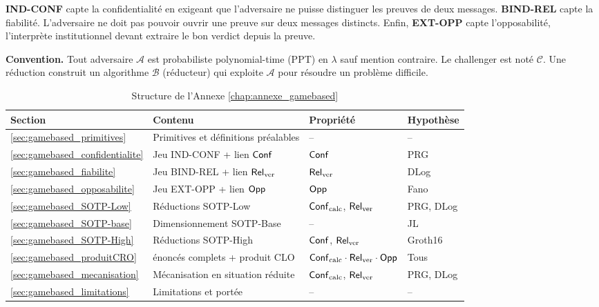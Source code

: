 \begin{sloppypar}
\textbf{IND-CONF} capte la confidentialit\'e en exigeant que l'adversaire ne puisse
distinguer les preuves de deux messages. \textbf{BIND-REL} capte la
fiabilit\'e. L'adversaire ne doit pas pouvoir ouvrir une preuve sur
deux messages distincts. Enfin, \textbf{EXT-OPP} capte l'opposabilit\'e,
l'interpr\`ete institutionnel devant extraire le bon verdict depuis la
preuve.

\noindent\textbf{Convention.} Tout adversaire $\mathcal{A}$ est
probabiliste polynomial-time (PPT) en $\lambda$ sauf mention contraire.
Le challenger est not\'e $\mathcal{C}$. Une r\'eduction construit un
algorithme $\mathcal{B}$ (r\'educteur) qui exploite $\mathcal{A}$ pour
r\'esoudre un probl\`eme difficile.

\begin{table}[htbp]
\centering
\caption{Structure de l'Annexe \ref{chap:annexe_gamebased}}
\label{tab:ann_g_structure}
\small
\begin{tabular}{@{}llll@{}}
\toprule
\textbf{Section} & \textbf{Contenu} & \textbf{Propri\'et\'e}
& \textbf{Hypoth\`ese} \\
\midrule
\ref{sec:gamebased_primitives} & Primitives et d\'efinitions pr\'ealables & -- & -- \\
\ref{sec:gamebased_confidentialite} & Jeu IND-CONF + lien $\mathsf{Conf}$ & $\mathsf{Conf}$ & PRG \\
\ref{sec:gamebased_fiabilite} & Jeu BIND-REL + lien $\mathsf{Rel}_{\mathrm{ver}}$ & $\mathsf{Rel}_{\mathrm{ver}}$ & DLog \\
\ref{sec:gamebased_opposabilite} & Jeu EXT-OPP + lien $\mathsf{Opp}$ & $\mathsf{Opp}$ & Fano \\
\ref{sec:gamebased_SOTP-Low} & R\'eductions SOTP-Low & $\mathsf{Conf}_{\mathrm{calc}}$, $\mathsf{Rel}_{\mathrm{ver}}$ & PRG, DLog \\
\ref{sec:gamebased_SOTP-base} & Dimensionnement SOTP-Base & -- & JL \\
\ref{sec:gamebased_SOTP-High} & R\'eductions SOTP-High & $\mathsf{Conf}$, $\mathsf{Rel}_{\mathrm{ver}}$ & Groth16 \\
\ref{sec:gamebased_produitCRO} & \'enonc\'es complets + produit CLO & $\mathsf{Conf}_{\mathrm{calc}}\cdot\mathsf{Rel}_{\mathrm{ver}}\cdot\mathsf{Opp}$ & Tous \\
\ref{sec:gamebased_mecanisation} & M\'ecanisation en situation r\'eduite & $\mathsf{Conf}_{\mathrm{calc}}$, $\mathsf{Rel}_{\mathrm{ver}}$ & PRG, DLog \\
\ref{sec:gamebased_limitations} & Limitations et port\'ee & -- & -- \\
\bottomrule
\end{tabular}
\end{table}
\end{sloppypar}

